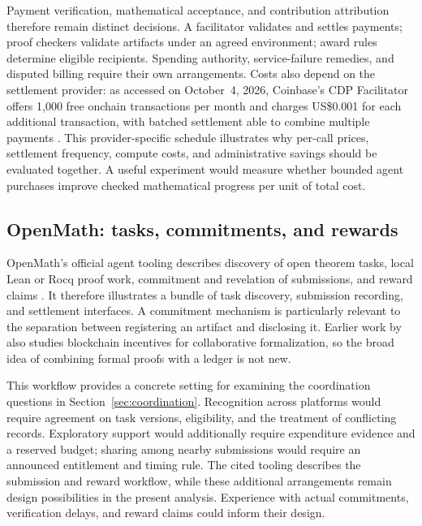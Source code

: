 \documentclass[11pt,a4paper]{article}
\begin{document}
Payment verification, mathematical acceptance, and contribution attribution therefore remain distinct decisions. A facilitator validates and settles payments; proof checkers validate artifacts under an agreed environment; award rules determine eligible recipients. Spending authority, service-failure remedies, and disputed billing require their own arrangements. Costs also depend on the settlement provider: as accessed on October~4, 2026, Coinbase's CDP Facilitator offers 1,000 free onchain transactions per month and charges US\$0.001 for each additional transaction, with batched settlement able to combine multiple payments \citep{cdpx402}. This provider-specific schedule illustrates why per-call prices, settlement frequency, compute costs, and administrative savings should be evaluated together. A useful experiment would measure whether bounded agent purchases improve checked mathematical progress per unit of total cost.

\subsection{OpenMath: tasks, commitments, and rewards}
OpenMath's official agent tooling describes discovery of open theorem tasks, local Lean or Rocq proof work, commitment and revelation of submissions, and reward claims \citep{openmath}. It therefore illustrates a bundle of task discovery, submission recording, and settlement interfaces. A commitment mechanism is particularly relevant to the separation between registering an artifact and disclosing it. Earlier work by \citet{lim} also studies blockchain incentives for collaborative formalization, so the broad idea of combining formal proofs with a ledger is not new.

This workflow provides a concrete setting for examining the coordination questions in Section~\ref{sec:coordination}. Recognition across platforms would require agreement on task versions, eligibility, and the treatment of conflicting records. Exploratory support would additionally require expenditure evidence and a reserved budget; sharing among nearby submissions would require an announced entitlement and timing rule. The cited tooling describes the submission and reward workflow, while these additional arrangements remain design possibilities in the present analysis. Experience with actual commitments, verification delays, and reward claims could inform their design.
\end{document}
